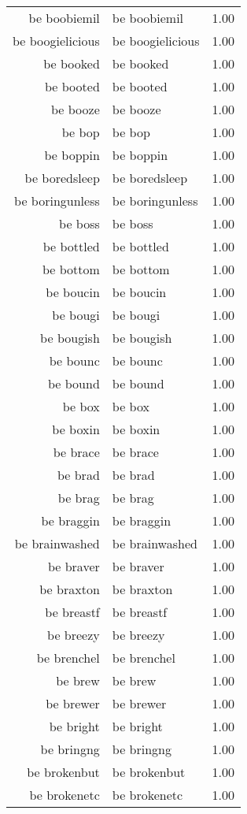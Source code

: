 \begin{table}[ht]
\begin{tabular}{rlr}
  be boobiemil & be boobiemil & 1.00 \\ 
  be boogielicious & be boogielicious & 1.00 \\ 
  be booked & be booked & 1.00 \\ 
  be booted & be booted & 1.00 \\ 
  be booze & be booze & 1.00 \\ 
  be bop & be bop & 1.00 \\ 
  be boppin & be boppin & 1.00 \\ 
  be boredsleep & be boredsleep & 1.00 \\ 
  be boringunless & be boringunless & 1.00 \\ 
  be boss & be boss & 1.00 \\ 
  be bottled & be bottled & 1.00 \\ 
  be bottom & be bottom & 1.00 \\ 
  be boucin & be boucin & 1.00 \\ 
  be bougi & be bougi & 1.00 \\ 
  be bougish & be bougish & 1.00 \\ 
  be bounc & be bounc & 1.00 \\ 
  be bound & be bound & 1.00 \\ 
  be box & be box & 1.00 \\ 
  be boxin & be boxin & 1.00 \\ 
  be brace & be brace & 1.00 \\ 
  be brad & be brad & 1.00 \\ 
  be brag & be brag & 1.00 \\ 
  be braggin & be braggin & 1.00 \\ 
  be brainwashed & be brainwashed & 1.00 \\ 
  be braver & be braver & 1.00 \\ 
  be braxton & be braxton & 1.00 \\ 
  be breastf & be breastf & 1.00 \\ 
  be breezy & be breezy & 1.00 \\ 
  be brenchel & be brenchel & 1.00 \\ 
  be brew & be brew & 1.00 \\ 
  be brewer & be brewer & 1.00 \\ 
  be bright & be bright & 1.00 \\ 
  be bringng & be bringng & 1.00 \\ 
  be brokenbut & be brokenbut & 1.00 \\ 
  be brokenetc & be brokenetc & 1.00 \\ 

\end{tabular}
\end{table}
